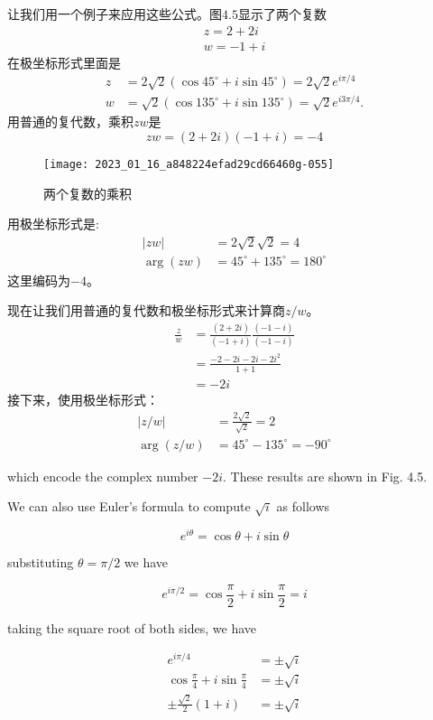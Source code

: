 让我们用一个例子来应用这些公式。图$4.5$显示了两个复数
$$
\begin{gathered}
z=2+2 i \\
w=-1+i
\end{gathered}
$$
在极坐标形式里面是
$$
\begin{aligned}
z & =2 \sqrt{2}\left(\cos 45^{\circ}+i \sin 45^{\circ}\right)=2 \sqrt{2} e^{i \pi / 4} \\
w & =\sqrt{2}\left(\cos 135^{\circ}+i \sin 135^{\circ}\right)=\sqrt{2} e^{i 3 \pi / 4} .
\end{aligned}
$$
用普通的复代数，乘积$z w$是
$$
z w=(2+2 i)(-1+i)=-4
$$
\begin{figure}[h!]
    \centering
    \texttt{[image: 2023\_01\_16\_a848224efad29cd66460g-055]}
    \caption[short]{两个复数的乘积}
\end{figure}
用极坐标形式是:
$$
\begin{aligned}
|z w| & =2 \sqrt{2} \sqrt{2}=4 \\
\arg (z w) & =45^{\circ}+135^{\circ}=180^{\circ}
\end{aligned}
$$
这里编码为$-4$。

现在让我们用普通的复代数和极坐标形式来计算商$z / w$。
$$
\begin{aligned}
\frac{z}{w} & =\frac{(2+2 i)}{(-1+i)} \frac{(-1-i)}{(-1-i)} \\
& =\frac{-2-2 i-2 i-2 i^{2}}{1+1} \\
& =-2 i
\end{aligned}
$$
接下来，使用极坐标形式：
$$
\begin{aligned}
|z / w| & =\frac{2 \sqrt{2}}{\sqrt{2}}=2 \\
\arg (z / w) & =45^{\circ}-135^{\circ}=-90^{\circ}
\end{aligned}
$$

which encode the complex number $-2 i$. These results are shown in Fig. 4.5.

We can also use Euler's formula to compute $\sqrt{i}$ as follows

$$
e^{i \theta}=\cos \theta+i \sin \theta
$$

substituting $\theta=\pi / 2$ we have

$$
e^{i \pi / 2}=\cos \frac{\pi}{2}+i \sin \frac{\pi}{2}=i
$$

taking the square root of both sides, we have

$$
\begin{aligned}
e^{i \pi / 4} & =\pm \sqrt{i} \\
\cos \frac{\pi}{4}+i \sin \frac{\pi}{4} & =\pm \sqrt{i} \\
\pm \frac{\sqrt{2}}{2}(1+i) & =\pm \sqrt{i}
\end{aligned}
$$

